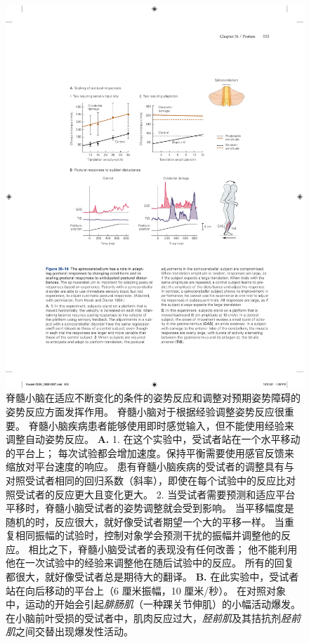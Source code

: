 \begin{figure}[htbp]
	\centering
	\includegraphics[width=0.85\linewidth]{chap36/fig_36_14}
	\caption{脊髓小脑在适应不断变化的条件的姿势反应和调整对预期姿势障碍的姿势反应方面发挥作用。
		脊髓小脑对于根据经验调整姿势反应很重要。
		脊髓小脑疾病患者能够使用即时感觉输入，但不能使用经验来调整自动姿势反应\cite{horak1994cerebellar}。
		\textbf{A.} 1. 在这个实验中，受试者站在一个水平移动的平台上；
		每次试验都会增加速度。保持平衡需要使用感官反馈来缩放对平台速度的响应。
		患有脊髓小脑疾病的受试者的调整具有与对照受试者相同的回归系数（斜率），即使在每个试验中的反应比对照受试者的反应更大且变化更大。
		2. 当受试者需要预测和适应平台平移时，脊髓小脑受试者的姿势调整就会受到影响。
		当平移幅度是随机的时，反应很大，就好像受试者期望一个大的平移一样。
		当重复相同振幅的试验时，控制对象学会预测干扰的振幅并调整他的反应。
		相比之下，脊髓小脑受试者的表现没有任何改善；
		他不能利用他在一次试验中的经验来调整他在随后试验中的反应。
		所有的回复都很大，就好像受试者总是期待大的翻译。
		\textbf{B.} 在此实验中，受试者站在向后移动的平台上（6 厘米振幅，10 厘米/秒）。
		在对照对象中，运动的开始会引起\textit{腓肠肌}（一种踝关节伸肌）的小幅活动爆发。
		在小脑前叶受损的受试者中，肌肉反应过大，\textit{胫前肌}及其拮抗剂\textit{胫前肌}之间交替出现爆发性活动。}
	\label{fig:36_14}
\end{figure}


